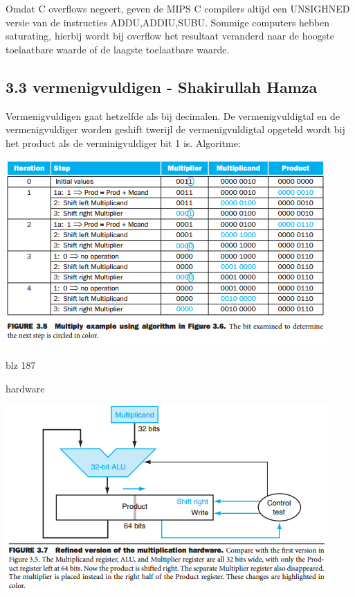 Omdat C overflows negeert, geven de MIPS C compilers altijd een UNSIGHNED versie van de instructies ADDU,ADDIU,SUBU.
Sommige computers hebben saturating, hierbij wordt bij overflow het resultaat veranderd naar de hoogste toelaatbare waarde of de laagste toelaatbare waarde.
\subsection{3.3 vermenigvuldigen - Shakirullah Hamza}						
\begin{figure}
\end{figure}


Vermenigvuldigen gaat hetzelfde als bij decimalen.
De vermenigvuldigtal en de vermenigvuldiger worden geshift twerijl de vermenigvuldigtal opgeteld wordt bij het product als de verminigvuldiger bit 1 is. 
Algoritme:
\usepackage{graphicx}
\graphicspath{{/afbeeldingen}}
\includegraphics{1} 

blz 187
\newpage

hardware

\includegraphics{2}

